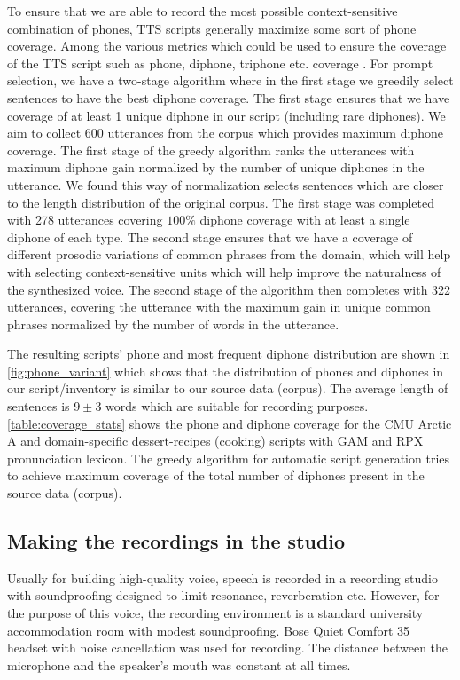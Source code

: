 \documentclass[lettersize,journal]{IEEEtran}
\begin{document}
To ensure that we are able to record the most possible context-sensitive combination of phones, TTS scripts generally maximize some sort of phone coverage. Among the various metrics which could be used to ensure the coverage of the TTS script such as phone, diphone, triphone etc. coverage \cite{Kominek2004TheCA}. For prompt selection, we have a two-stage algorithm where in the first stage we greedily select sentences to have the best diphone coverage. The first stage ensures that we have coverage of at least 1 unique diphone in our script (including rare diphones). We aim to collect 600 utterances from the corpus which provides maximum diphone coverage. The first stage of the greedy algorithm ranks the utterances with maximum diphone gain normalized by the number of unique diphones in the utterance. We found this way of normalization selects sentences which are closer to the length distribution of the original corpus. The first stage was completed with 278 utterances covering $100\%$ diphone coverage with at least a single diphone of each type. The second stage ensures that we have a coverage of different prosodic variations of common phrases from the domain, which will help with selecting context-sensitive units which will help improve the naturalness of the synthesized voice. The second stage of the algorithm then completes with 322 utterances, covering the utterance with the maximum gain in unique common phrases normalized by the number of words in the utterance.

The resulting scripts' phone and most frequent diphone distribution are shown in \autoref{fig:phone_variant} which shows that the distribution of phones and diphones in our script/inventory is similar to our source data (corpus). The average length of sentences is $9 \pm 3$ words which are suitable for recording purposes. \autoref{table:coverage_stats} shows the phone and diphone coverage for the CMU Arctic A \cite{Kominek2004TheCA} and domain-specific dessert-recipes (cooking) scripts with GAM and RPX pronunciation lexicon. The greedy algorithm for automatic script generation tries to achieve maximum coverage of the total number of diphones present in the source data (corpus). 


\subsection{Making the recordings in the studio}
Usually for building high-quality voice, speech is recorded in  a recording studio with soundproofing designed to limit resonance, reverberation etc. However, for the purpose of this voice, the recording environment is a standard university accommodation room with modest soundproofing. Bose Quiet Comfort 35 headset with noise cancellation was used for recording. The distance between the microphone and the speaker's mouth was constant at all times. 
\end{document}
